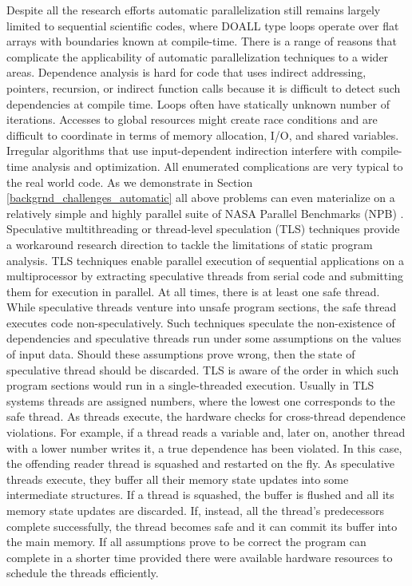 \quad Despite all the research efforts automatic parallelization still remains largely limited to sequential scientific codes, where DOALL type loops operate over flat arrays with boundaries known at compile-time. There is a range of reasons that complicate the applicability of automatic parallelization techniques to a wider areas. Dependence analysis is hard for code that uses indirect addressing, pointers, recursion, or indirect function calls because it is difficult to detect such dependencies at compile time. Loops often have statically unknown number of iterations. Accesses to global resources might create race conditions and are difficult to coordinate in terms of memory allocation, I/O, and shared variables. Irregular algorithms that use input-dependent indirection interfere with compile-time analysis and optimization. All enumerated complications are very typical to the real world code. As we demonstrate in Section \ref{backgrnd_challenges_automatic} all above problems can even materialize on a relatively simple and highly parallel suite of NASA Parallel Benchmarks (NPB) \cite{nasa-parallel-benchmarks}.\newline\null
\quad Speculative multithreading or thread-level speculation (TLS) techniques provide a workaround research direction to tackle the limitations of static program analysis. TLS techniques enable parallel execution of sequential applications on a multiprocessor by extracting speculative threads from serial code and submitting them for execution in parallel. At all times, there is at least one safe thread. While speculative threads venture into unsafe program sections, the safe thread executes code non-speculatively. Such techniques speculate the non-existence of dependencies \cite{10.1145/291069.291020} and speculative threads run under some assumptions on the values of input data. Should these assumptions prove wrong, then the state of speculative thread should be discarded. TLS is aware of the order in which such program sections would run in a single-threaded execution. Usually in TLS systems threads are assigned numbers, where the lowest one corresponds to the safe thread. As threads execute, the hardware checks for cross-thread dependence violations. For example, if a thread reads a variable and, later on, another thread with a lower number writes it, a true dependence has been violated. In this case, the offending reader thread is squashed and restarted on the fly. As speculative threads execute, they buffer all their memory state updates into some intermediate structures. If a thread is squashed, the buffer is flushed and all its memory state updates are discarded. If, instead, all the thread’s predecessors complete successfully, the thread becomes safe and it can commit its buffer into the main memory. If all assumptions prove to be correct the program can complete in a shorter time provided there were available hardware resources to schedule the threads efficiently.\newline\null
